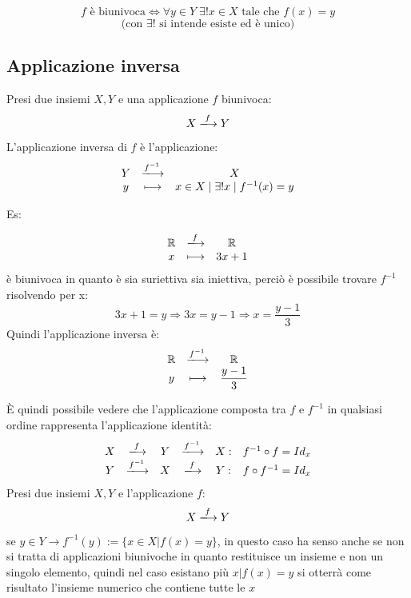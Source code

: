 \documentclass[a4paper,12pt]{article}
\begin{document}
	\[
	f \text{ è biunivoca} \iff \forall y \in Y \; \exists! x \in X \text{ tale che } f(x) = y 
	\]
	\[
	\text{(con } \exists! \text{ si intende esiste ed è unico})
	\]
	
	
	\subsection{Applicazione inversa}
	Presi due insiemi $X, Y$ e una applicazione $f$ biunivoca:
	\[
	X \xlongrightarrow{f} Y
	\] 
	
	L'applicazione inversa di $f$ è l'applicazione:
	\[
	\begin{array}{c c c}
		Y & \xlongrightarrow{f^{-1}} & X \\
		y & \longmapsto & x \in X \mid \exists ! x \mid f^{-1}(x) = y
	\end{array}
	\]
	
	Es:
	
	\[
	\begin{array}{c c c}
		\mathbb{R} & \xlongrightarrow{f} & \mathbb{R} \\
		x & \longmapsto & 3x + 1
	\end{array}
	\]
	è biunivoca in quanto è sia suriettiva sia iniettiva, perciò è possibile trovare $f^{-1}$ risolvendo per x:
	\[
	3x + 1 = y \Longrightarrow 3x = y - 1 \Longrightarrow x = \dfrac{y -1}{3}
	\]
	Quindi l'applicazione inversa è:
	\[
	\begin{array}{c c c}
		\mathbb{R} & \xlongrightarrow{f^{-1}} & \mathbb{R} \\
		y & \longmapsto & \dfrac{y -1}{3}
	\end{array}
	\]
	
	È quindi possibile vedere che l'applicazione composta tra $f$ e $f^{-1}$ in qualsiasi ordine rappresenta l'applicazione identità:	
	\[
	\begin{array}{c c c c c c}
		X & \xlongrightarrow{f} & Y & \xlongrightarrow{f^{-1}} & X: & f^{-1} \circ f = Id_x \\
		Y & \xlongrightarrow{f^{-1}} & X & \xlongrightarrow{f} & Y: & f \circ f^{-1} = Id_x
	\end{array}
	\]\newline
	Presi due insiemi $X, Y$ e l'applicazione $f$:
	\[
	X \xlongrightarrow{f} Y
 	\]
 	
	se $y \in Y \rightarrow f^{-1}(y) := \{x \in X | f(x) = y\}$, in questo caso ha senso anche se non si tratta di applicazioni biunivoche in quanto restituisce un insieme e non un singolo elemento, quindi nel caso esistano più $x | f(x) = y$ si otterrà come risultato l'insieme numerico che contiene tutte le $x$
	
\end{document}
